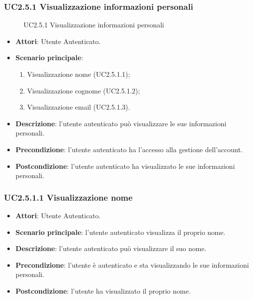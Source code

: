 \subsubsection{UC2.5.1 Visualizzazione informazioni personali}
\begin{figure}[H]
\centering
\noindent{}
\caption{UC2.5.1 Visualizzazione informazioni personali}
\end{figure}
\begin{itemize}
\item \textbf{Attori}: Utente Autenticato.
\item \textbf{Scenario principale}:
\begin{enumerate}
\item Visualizzazione nome (UC2.5.1.1);
\item Visualizzazione cognome (UC2.5.1.2);
\item Visualizzazione email (UC2.5.1.3).
\end{enumerate}
\item \textbf{Descrizione}: l’utente autenticato può visualizzare le sue informazioni personali.
\item \textbf{Precondizione}: l’utente autenticato ha l’accesso alla gestione dell’account.
\item \textbf{Postcondizione}: l’utente autenticato ha visualizzato le sue informazioni personali.
\end{itemize}
\subsubsection{UC2.5.1.1 Visualizzazione nome}
\begin{itemize}
\item \textbf{Attori}: Utente Autenticato.
\item \textbf{Scenario principale}: l'utente autenticato visualizza il proprio nome.
\item \textbf{Descrizione}: l'utente autenticato può visualizzare il suo nome.
\item \textbf{Precondizione}: l'utente è autenticato e sta visualizzando le sue informazioni personali.
\item \textbf{Postcondizione}: l'utente ha visualizzato il proprio nome.
\end{itemize}
